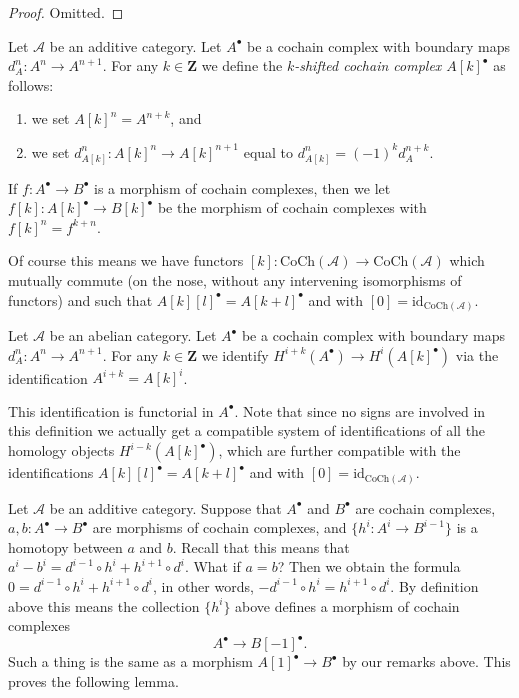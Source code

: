\begin{proof}
Omitted.
\end{proof}

\begin{definition}
\label{definition-shift-cochain}
Let $\mathcal{A}$ be an additive category.
Let $A^\bullet$ be a cochain complex
with boundary maps $d_A^n : A^n \to A^{n + 1}$.
For any $k \in \mathbf{Z}$ we define the
{\it $k$-shifted cochain complex $A[k]^\bullet$}
as follows:
\begin{enumerate}
\item we set $A[k]^n = A^{n + k}$, and
\item we set $d_{A[k]}^n : A[k]^n \to A[k]^{n + 1}$
equal to $d_{A[k]}^n = (-1)^k d_A^{n + k}$.
\end{enumerate}
If $f : A^\bullet \to B^\bullet$ is a morphism of
cochain complexes, then we let
$f[k] : A[k]^\bullet \to B[k]^\bullet$ be the
morphism of cochain complexes with
$f[k]^n = f^{k + n}$.
\end{definition}

\noindent
Of course this means we have functors
$[k] : \text{CoCh}(\mathcal{A}) \to \text{CoCh}(\mathcal{A})$
which mutually commute (on the nose, without
any intervening isomorphisms of functors) and
such that $A[k][l]^\bullet = A[k + l]^\bullet$ and
with $[0] = \text{id}_{\text{CoCh}(\mathcal{A})}$.

\begin{definition}
\label{definition-cohomology-shift}
Let $\mathcal{A}$ be an abelian category.
Let $A^\bullet$ be a cochain complex
with boundary maps $d_A^n : A^n \to A^{n + 1}$.
For any $k \in \mathbf{Z}$ we identify
{\it $H^{i + k}(A^\bullet) \longrightarrow H^i(A[k]^\bullet)$}
via the identification $A^{i + k} = A[k]^i$.
\end{definition}

\noindent
This identification is functorial in $A^\bullet$.
Note that since no signs are involved in this
definition we actually get a compatible system
of identifications of all the homology
objects $H^{i - k}(A[k]^\bullet)$, which are
further compatible with the identifications
$A[k][l]^\bullet = A[k + l]^\bullet$ and
with $[0] = \text{id}_{\text{CoCh}(\mathcal{A})}$.

\medskip\noindent
Let $\mathcal{A}$ be an additive category.
Suppose that $A^\bullet$ and $B^\bullet$ are
cochain complexes, $a, b : A^\bullet \to B^\bullet$ are
morphisms of cochain complexes, and $\{h^i : A^i \to B^{i - 1}\}$
is a homotopy between $a$ and $b$. Recall that this means
that
$a^i - b^i = d^{i - 1} \circ h^i + h^{i + 1} \circ d^i$.
What if $a = b$? Then we obtain the formula
$0 = d^{i - 1} \circ h^i + h^{i + 1} \circ d^i$,
in other words, $ - d^{i - 1} \circ h^i = h^{i + 1} \circ d^i$.
By definition above this means the collection $\{h^i\}$
above defines a morphism of cochain complexes
$$
A^\bullet \longrightarrow B[-1]^\bullet.
$$
Such a thing is the same as a morphism $A[1]^\bullet \to B^\bullet$
by our remarks above. This proves the following lemma.

